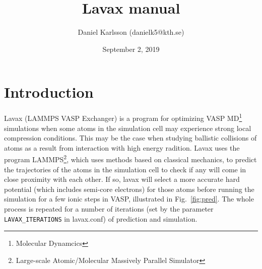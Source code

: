 \documentclass{article}
\title{{\Huge \bfseries Lavax manual}}
\author{Daniel Karlsson (danielk5@kth.se)}
\date{September 2, 2019}
\begin{document}
\maketitle

\tableofcontents



\section{Introduction}
Lavax (LAMMPS VASP Exchanger) is a program for optimizing VASP MD\footnote{Molecular Dynamcics} simulations when some atoms in the simulation cell may experience strong local compression conditions. This may be the case when studying ballistic collisions of atoms as a result from interaction with high energy radition. Lavax uses the program LAMMPS\footnote{Large-scale Atomic/Molecular Massively Parallel Simulator}, which uses methods based on classical mechanics, to predict the trajectories of the atoms in the simulation cell to check if any will come in close proximity with each other. If so, lavax will select a more accurate hard potential (which includes semi-core electrons) for those atoms before running the simulation for a few ionic steps in VASP, illustrated in Fig.~\ref{fig:pred}.
The whole process is repeated for a number of iterations (set by the parameter \texttt{LAVAX\_ITERATIONS} in lavax.conf) of prediction and simulation.
\end{document}
